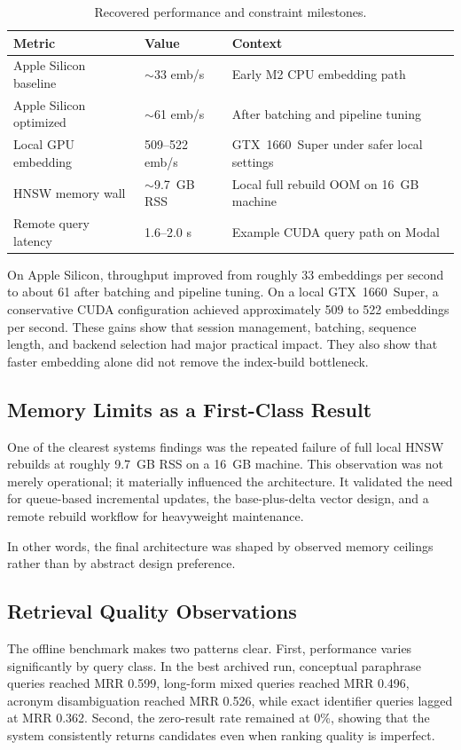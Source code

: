 \documentclass[conference]{IEEEtran}
\begin{document}
\begin{table}[t]
\caption{Recovered performance and constraint milestones.}
\label{tab:perf}
\centering
\small
\setlength{\tabcolsep}{4pt}
\begin{tabular}{p{}p{}p{}}
\toprule
\textbf{Metric} & \textbf{Value} & \textbf{Context} \\
\midrule
Apple Silicon baseline & $\sim$33 emb/s & Early M2 CPU embedding path \\
Apple Silicon optimized & $\sim$61 emb/s & After batching and pipeline tuning \\
Local GPU embedding & 509--522 emb/s & GTX~1660~Super under safer local settings \\
HNSW memory wall & $\sim$9.7~GB RSS & Local full rebuild OOM on 16~GB machine \\
Remote query latency & 1.6--2.0 s & Example CUDA query path on Modal \\
\bottomrule
\end{tabular}
\end{table}

On Apple Silicon, throughput improved from roughly 33 embeddings per second to about 61 after batching and pipeline tuning. On a local GTX~1660~Super, a conservative CUDA configuration achieved approximately 509 to 522 embeddings per second. These gains show that session management, batching, sequence length, and backend selection had major practical impact. They also show that faster embedding alone did not remove the index-build bottleneck.

\subsection{Memory Limits as a First-Class Result}
One of the clearest systems findings was the repeated failure of full local HNSW rebuilds at roughly 9.7~GB RSS on a 16~GB machine. This observation was not merely operational; it materially influenced the architecture. It validated the need for queue-based incremental updates, the base-plus-delta vector design, and a remote rebuild workflow for heavyweight maintenance.

In other words, the final architecture was shaped by observed memory ceilings rather than by abstract design preference.

\subsection{Retrieval Quality Observations}
The offline benchmark makes two patterns clear. First, performance varies significantly by query class. In the best archived run, conceptual paraphrase queries reached MRR 0.599, long-form mixed queries reached MRR 0.496, acronym disambiguation reached MRR 0.526, while exact identifier queries lagged at MRR 0.362. Second, the zero-result rate remained at 0\%, showing that the system consistently returns candidates even when ranking quality is imperfect.
\end{document}
